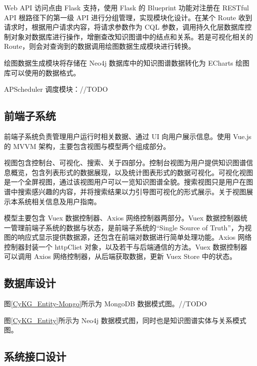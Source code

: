 \documentclass[a4paper,AutoFakeBold,oneside,12pt]{book}
\begin{document}
Web API 访问点由 Flask 支持，使用 Flask 的 Blueprint 功能对注册在 RESTful API 根路径下的第一级 API 进行分组管理，实现模块化设计。在某个 Route 收到请求时，根据用户请求内容，将请求参数作为 CQL 参数，调用持久化层数据库控制对象对数据库进行操作，增删查改知识图谱中的结点和关系。若是可视化相关的 Route，则会对查询到的数据调用绘图数据生成模块进行转换。

绘图数据生成模块将存储在 Neo4j 数据库中的知识图谱数据转化为 ECharts 绘图库可以使用的数据格式。

APScheduler 调度模块：//TODO

\subsection{前端子系统}

前端子系统负责管理用户运行时相关数据、通过 UI 向用户展示信息。使用 Vue.js 的 MVVM 架构，主要包含视图与模型两个组成部分。

视图包含控制台、可视化、搜索、关于四部分。控制台视图为用户提供知识图谱信息概览，包含列表形式的数据展现，以及统计图表形式的数据可视化。可视化视图是一个全屏视图，通过该视图用户可以一览知识图谱全貌。搜索视图只是用户在图谱中搜索感兴趣的内容，并将搜索结果以力引导图可视化的形式展示。关于视图展示本系统相关信息及用户指南。

模型主要包含 Vuex 数据控制器、Axios 网络控制器两部分。Vuex 数据控制器统一管理前端子系统的数据与状态，是前端子系统的“Single Source of Truth”，为视图的响应式显示提供数据源，还包含在前端对数据进行简单处理功能。Axios 网络控制器封装一个 httpCliet 对象，以及若干与后端通信的方法。Vuex 数据控制器可以调用 Axios 网络控制器，从后端获取数据，更新 Vuex Store 中的状态。

\subsection{数据库设计}

图\ref{CyKG_Entity-Mongo}所示为 MongoDB 数据模式图。//TODO


图\ref{CyKG_Entity}所示为 Neo4j 数据模式图，同时也是知识图谱实体与关系模式图。


\subsection{系统接口设计}
\end{document}
